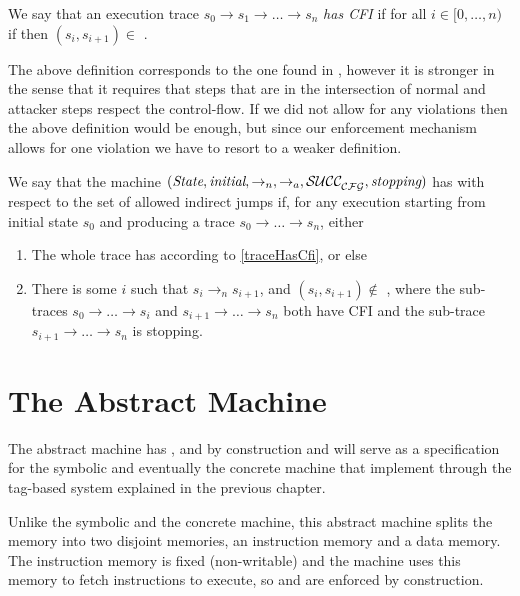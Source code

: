 \begin{definition}\label{traceHasCfi}
  We say that an execution trace $s_0 \to s_1 \to \ldots \to s_n$ {\em has CFI}
  if for all $ i \in [0,\ldots,n)$ if  then
  $(s_i,s_{i+1}) \in$ \SUCC .
\end{definition}


The above definition corresponds to the one found in \cite{AbadiBEL09}, however
it is stronger in the sense that it requires that steps that are in the
intersection of normal and attacker steps respect the control-flow. If we did
not allow for any violations then the above definition would be enough, but
since our enforcement mechanism allows for one violation we have to resort to a
weaker definition.

\begin{definition}[CFI]\label{cfi}
  We say that the machine
  $(\textit{State}, \textit{initial}, \to_n,\allowbreak \to_a, \mathcal{SUCC_\mathcal{CFG}^{}}, \textit{stopping})$
  has \CFI with respect to the set of allowed indirect jumps \CFG
  if, for any execution starting from initial state $s_0$
  and producing a trace $s_0 \to \ldots \to s_n$, either
  \begin{enumerate}
  \item The whole trace has \CFI according to
    \cref{traceHasCfi}, or else
  \item There is some $i$ such that $s_i \to_n s_{i+1}$,
  and $(s_i, s_{i+1}) \not \in$ \SUCC{}, where
  the sub-traces $s_0 \to \ldots \to s_i$ and
  $s_{i+1} \to \ldots \to s_n$ both have CFI
  and the sub-trace $s_{i+1} \to \ldots \to s_n$ is stopping.
  \end{enumerate}
\end{definition}

\section{The Abstract Machine}\label{sec:abstract_cfi}

The abstract machine has \CFI, \NXD and \NWC by construction and will
serve as a specification for the symbolic and eventually the concrete
machine that implement \CFI through the tag-based system explained in
the previous chapter.

Unlike the symbolic and the concrete machine, this abstract machine splits the 
memory into two disjoint memories, an instruction memory and a data memory. The
instruction memory is fixed (non-writable) and the machine uses this memory to
fetch instructions to execute, so \NWC and \NXD are enforced by construction.

